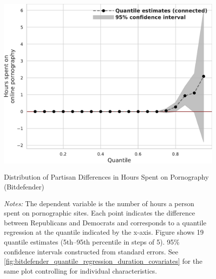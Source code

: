 \documentclass[12pt,twoside]{article}
\begin{document}
\begin{figure}[t]
	\centering
	\includegraphics[width=.6\linewidth]{figs/bitdefender_quantile_reg_duration_adult.pdf}
	\caption{Distribution of Partisan Differences in Hours Spent on Pornography (Bitdefender)}
	\caption*{\footnotesize \emph{Notes:} 
		The dependent variable is the number of hours a person spent on pornographic sites.
		Each point indicates the difference between Republicans and Democrats and corresponds to a quantile regression at the quantile indicated by the x-axis.
  Figure shows 19 quantile estimates (5th--95th percentile in steps of 5).
		95\% confidence intervals constructed from standard errors.
		See \cref{fig:bitdefender_quantile_regression_duration_covariates} for the same plot controlling for individual characteristics.
	}
	\label{fig:bitdefender_quantile_regression_duration}
\end{figure}
\end{document}
